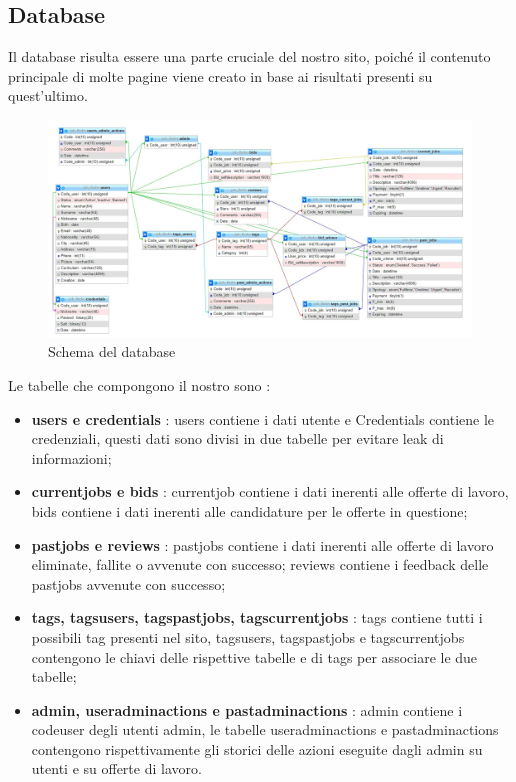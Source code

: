   \subsection{Database}
  Il database risulta essere una parte cruciale del nostro sito, poiché il contenuto principale di molte pagine viene creato in base ai risultati presenti su quest'ultimo. 
  \begin{figure}[h]
    \includegraphics[scale=0.4]{Images/DB.jpg}
    \caption{Schema del database}
    \centering
  \end{figure}
  Le tabelle che compongono il nostro sono :
  \begin{itemize}
    \item \textbf{users e credentials} : users contiene i dati utente e Credentials contiene le credenziali, questi dati sono divisi in due tabelle per evitare leak di informazioni;
    \item \textbf{current\textunderscore jobs e bids} : current\textunderscore job contiene i dati inerenti alle offerte di lavoro, bids contiene i dati inerenti alle candidature per le offerte in questione;
    \item \textbf{past\textunderscore jobs e reviews} : past\textunderscore jobs contiene i dati inerenti alle offerte di lavoro eliminate, fallite o avvenute con successo; reviews contiene i feedback delle past\textunderscore jobs avvenute con successo;
    \item \textbf{tags, tags\textunderscore users, tags\textunderscore past\textunderscore jobs, tags\textunderscore current\textunderscore jobs} : tags contiene tutti i possibili tag presenti nel sito, tags\textunderscore users, tags\textunderscore past\textunderscore jobs e tags\textunderscore current\textunderscore jobs contengono le chiavi delle rispettive tabelle e di tags per associare le due tabelle;
    \item \textbf{admin, user\textunderscore admin\textunderscore actions e past\textunderscore admin\textunderscore actions} : admin contiene i code\textunderscore user degli utenti admin, le tabelle user\textunderscore admin\textunderscore actions e past\textunderscore admin\textunderscore actions contengono rispettivamente gli storici delle azioni eseguite dagli admin su utenti e su offerte di lavoro. 
  
  \end{itemize}

